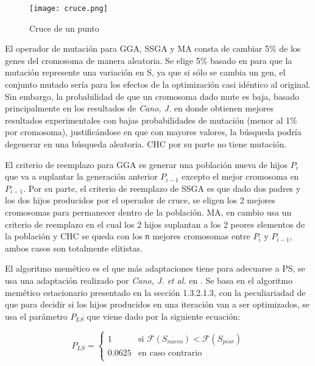 \begin{figure}[]
\centering
\texttt{[image: cruce.png]}
\caption[Cruce de un punto]{Cruce de un punto}
\label{cruce}
\end{figure}

El operador de mutación para GGA, SSGA y MA consta de cambiar 5\% de los genes del cromosoma de manera aleatoria. Se elige 5\%  basado en \cite{flores2014metaheuristics} para que la mutación represente una variación en S, ya que si sólo se cambia un gen, el conjunto mutado sería para los efectos de la optimización casi idéntico al original. Sin embargo, la probabilidad de que un cromosoma dado mute es baja, basado principalmente en los resultados de \emph{Cano, J.} en \cite{de2004reduccion} donde obtienen mejores resultados experimentales con bajas probabilidades de mutación (menor al 1\% por cromosoma), justificándose en que con mayores valores, la búsqueda podría degenerar en una búsqueda aleatoria. CHC por su parte no tiene mutación.

El criterio de reemplazo para GGA es generar una población nueva de hijos $P_i$ que va a suplantar la generación anterior $P_{i-1}$ excepto el mejor cromosoma en $P_{i-1}$. Por su parte, el criterio de reemplazo de SSGA es que dado dos padres y los dos hijos producidos por el operador de cruce, se eligen los 2 mejores cromosomas para permanecer dentro de la población. MA, en cambio usa un criterio de reemplazo en el cual los 2 hijos suplantan a los 2 peores elementos de la población y CHC se queda con los \texttt{n} mejores cromosomas entre $P_i$ y $P_{i-1}$, ambos casos son totalmente elitistas.

El algoritmo memético es el que más adaptaciones tiene para adecuarse a PS, se usa una adaptación realizado por \emph{Cano, J. et al.} en \cite{garcia2008memetic}. Se basa en el algoritmo memético estacionario presentado en la sección 1.3.2.1.3, con la peculiariadad de que para decidir si los hijos producidos en una iteración van a ser optimizados, se usa el parámetro $P_{LS}$ que viene dado por la siguiente ecuación:

\begin{equation}
P_{LS}=
\begin{cases}
1 & \text{si } \mathcal{F}(S_{nuevo}) < \mathcal{F}(S_{peor})\\
0.0625 & \text{en caso contrario}\\
\end{cases}
\end{equation}

